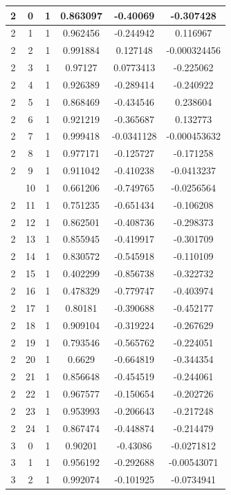 \documentclass[12pt,a4paper]{article}
\numberwithin{equation}{section}
\numberwithin{figure}{section}
\numberwithin{table}{section}
\begin{document}
\begin{longtable}{|c|c|c|c|c|c|}
2 & 0 & 1 & 0.863097 & -0.40069 & -0.307428 \\ \hline
2 & 1 & 1 & 0.962456 & -0.244942 & 0.116967 \\ \hline
2 & 2 & 1 & 0.991884 & 0.127148 & -0.000324456 \\ \hline
2 & 3 & 1 & 0.97127 & 0.0773413 & -0.225062 \\ \hline
2 & 4 & 1 & 0.926389 & -0.289414 & -0.240922 \\ \hline
2 & 5 & 1 & 0.868469 & -0.434546 & 0.238604 \\ \hline
2 & 6 & 1 & 0.921219 & -0.365687 & 0.132773 \\ \hline
2 & 7 & 1 & 0.999418 & -0.0341128 & -0.000453632 \\ \hline
2 & 8 & 1 & 0.977171 & -0.125727 & -0.171258 \\ \hline
2 & 9 & 1 & 0.911042 & -0.410238 & -0.0413237 \\ \hline
\pagebreak
2 & 10 & 1 & 0.661206 & -0.749765 & -0.0256564 \\ \hline
2 & 11 & 1 & 0.751235 & -0.651434 & -0.106208 \\ \hline
2 & 12 & 1 & 0.862501 & -0.408736 & -0.298373 \\ \hline
2 & 13 & 1 & 0.855945 & -0.419917 & -0.301709 \\ \hline
2 & 14 & 1 & 0.830572 & -0.545918 & -0.110109 \\ \hline
2 & 15 & 1 & 0.402299 & -0.856738 & -0.322732 \\ \hline
2 & 16 & 1 & 0.478329 & -0.779747 & -0.403974 \\ \hline
2 & 17 & 1 & 0.80181 & -0.390688 & -0.452177 \\ \hline
2 & 18 & 1 & 0.909104 & -0.319224 & -0.267629 \\ \hline
2 & 19 & 1 & 0.793546 & -0.565762 & -0.224051 \\ \hline
2 & 20 & 1 & 0.6629 & -0.664819 & -0.344354 \\ \hline
2 & 21 & 1 & 0.856648 & -0.454519 & -0.244061 \\ \hline
2 & 22 & 1 & 0.967577 & -0.150654 & -0.202726 \\ \hline
2 & 23 & 1 & 0.953993 & -0.206643 & -0.217248 \\ \hline
2 & 24 & 1 & 0.867474 & -0.448874 & -0.214479 \\ \hline
3 & 0 & 1 & 0.90201 & -0.43086 & -0.0271812 \\ \hline
3 & 1 & 1 & 0.956192 & -0.292688 & -0.00543071 \\ \hline
3 & 2 & 1 & 0.992074 & -0.101925 & -0.0734941 \\ \hline

\end{longtable}
\end{document}
